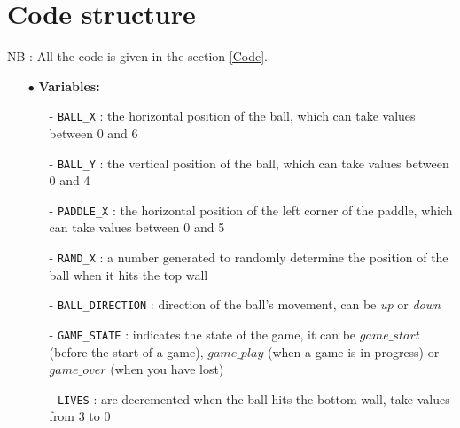 \section{Code structure} 
NB : All the code is given in the section \ref{Code}.

\begin{itemize}
    \item[$\bullet$] \textbf{Variables:}
    \begin{itemize}
        \item[-] \texttt{BALL\_X} : the horizontal position of the ball, which can take values between 0 and 6\\
        
        \item[-] \texttt{BALL\_Y}  : the vertical position of the ball, which can take values between 0 and 4\\
        
        \item[-] \texttt{PADDLE\_X} : the horizontal position of the left corner of the paddle, which can take values between 0 and 5\\
        
        \item[-] \texttt{RAND\_X} : a number generated to randomly determine the position of the ball when it hits the top wall\\
        
        \item[-] \texttt{BALL\_DIRECTION} : direction of the ball's movement, can be \textit{up} or \textit{down}\\
        
        \item[-] \texttt{GAME\_STATE} : indicates the state of the game, it can be $game\_start$ (before the start of a game), $game\_play$ (when a game is in progress) or $game\_over$ (when you have lost) \\
        
        \item[-] \texttt{LIVES} : are decremented when the ball hits the bottom wall, take values from 3 to 0
        

\end{itemize}
\end{itemize}

